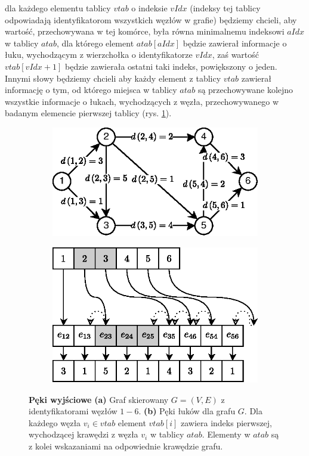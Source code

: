 dla każdego elementu tablicy $vtab$ o indeksie $vIdx$ (indeksy tej tablicy odpowiadają identyfikatorom wszystkich węzłów w grafie) będziemy chcieli, aby wartość, przechowywana w tej komórce, była równa minimalnemu indeksowi $aIdx$ w tablicy $atab$, dla którego element $atab \left[ aIdx \right] $ będzie zawierał informacje o łuku, wychodzącym z wierzchołka o identyfikatorze $vIdx$, zaś wartość $vtab \left[ vIdx+1 \right] $ będzie zawierała ostatni taki indeks, powiększony o jeden. Innymi słowy będziemy chcieli aby każdy element z tablicy $vtab$ zawierał informację o tym, od którego miejsca w tablicy $atab$ są przechowywane kolejno wszystkie informacje o łukach, wychodzących z węzła, przechowywanego w badanym elemencie pierwszej tablicy (rys. \ref{fig:forwardStarRepresentation}).

\begin{figure}[!htbp]
	\centering
	\begin{subfigure}[b]{0.5\textwidth}
		\includegraphics[width=\textwidth]{Chapter_I/4/1_4a.eps}
		\caption{}
	\end{subfigure}%
	\qquad
	\begin{subfigure}[b]{0.4\textwidth}
		\includegraphics[width=\textwidth]{Chapter_I/4/1_4b.eps}
		\caption{}
	\end{subfigure}
	\caption{\textbf{Pęki wyjściowe} \textbf{(a)} Graf skierowany $G = \left( V, E \right)$ z identyfikatorami węzłów $1-6$. \textbf{(b)} Pęki łuków dla grafu $G$. Dla każdego węzła $v_{i} \in vtab$ element $ vtab \left[ i \right] $ zawiera indeks pierwszej, wychodzącej krawędzi z węzła $v_{i}$ w tablicy $atab$. Elementy w $atab$ są z kolei wskazaniami na odpowiednie krawędzie grafu.}\label{fig:forwardStarRepresentation}
\end{figure}

